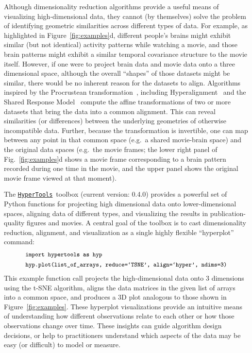 \documentclass[twoside,11pt]{article}
\newcommand{\hypertools}{\href{https://github.com/ContextLab/hypertools}{\texttt{HyperTools}}}
\begin{document}
Although dimensionality reduction algorithms provide a useful means of visualizing high-dimensional data, they cannot (by themselves) solve the problem of identifying geometric similarities across different types of data.  For example, as highlighted in Figure~\ref{fig:examples}d, different people's brains might exhibit similar (but not identical) activity patterns while watching a movie, and those brain patterns might exhibit a similar temporal covariance structure to the movie itself.  However, if one were to project brain data and movie data onto a three dimensional space, although the overall ``shapes'' of those datasets might be similar, there would be no inherent reason for the datasets to align.  Algorithms inspired by the Procrustean transformation~\citep{Scho66}, including Hyperalignment~\citep{HaxbEtal11} and the Shared Response Model~\citep{ChenEtal15} compute the affine transformations of two or more datasets that bring the data into a common alignment.  This can reveal similarities (or differences) between the underlying geometries of otherwise incompatible data.  Further, because the transformation is invertible, one can map between any point in that common space (e.g.\ a shared movie-brain space) and the original data spaces (e.g.\ the movie frames; the lower right panel of Fig.~\ref{fig:examples}d shows a movie frame corresponding to a brain pattern recorded during one time in the movie, and the upper panel shows the original movie frame viewed at that moment).

The \hypertools~toolbox (current version: 0.4.0) provides a powerful set of Python functions for projecting high dimensional data onto lower-dimensional spaces, aligning data of different types, and visualizing the results in publication-quality figures and movies.  A central goal of the toolbox is to cast dimensionality reduction, alignment, and visualization as a single highly flexible ``hyperplot'' command:
\begin{align}
& \texttt{\small import hypertools as hyp}\\
& \texttt{\small hyp.plot(list\_of\_arrays, reduce=`TSNE', align=`hyper', ndims=3)}\label{eqn:hyperplot}
\end{align}
This example function call projects the high-dimensional data onto 3 dimensions using the t-SNE algorithm, aligns the data matrices in the given list of arrays into a common space, and produces a 3D plot analogous to those shown in Figure~\ref{fig:examples}.  These hyperplot visualizations provide an intuitive means of understanding how different observations relate to each other or how those observations change over time.  These insights can guide algorithm design decisions, or help to practitioners understand which aspects of the data may be easy (or difficult) to model or measure.
\end{document}
